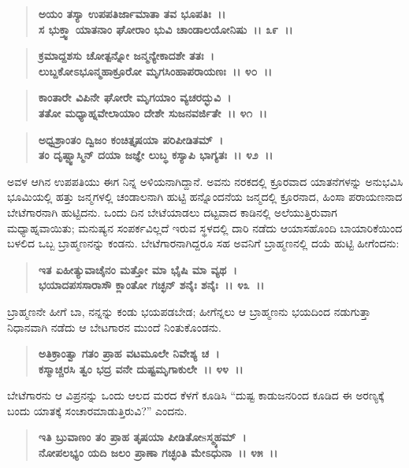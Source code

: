 \begin{verse}
\textbf{ಅಯಂ ತಸ್ಯಾ ಉಪಪತಿರ್ಜಾಮಾತಾ ತವ ಭೂಪತಿಃ~।।}\\\textbf{ಸ ಭುಕ್ತ್ವಾ ಯಾತನಾಂ ಘೋರಾಂ ಭುವಿ ಚಾಂಡಾಲಯೋನಿಷು~।। ೩೯~।।}
\end{verse}

\begin{verse}
\textbf{ಕ್ರಮಾದ್ದಶಸು ಚೋತ್ಪನ್ನೋ ಜನ್ಮನ್ಯೇಕಾದಶೇ ತತಃ~।}\\\textbf{ಲುಬ್ದಕೋಽಭೂನ್ಮಹಾಕ್ರೂರೋ ಮೃಗಸಿಂಹಾಪರಾಯಣಃ~।। ೪೦~।। }
\end{verse}

\begin{verse}
\textbf{ಕಾಂತಾರೇ ವಿಪಿನೇ ಘೋರೇ ಮೃಗಯಾಂ ವ್ಯಚರದ್ಭುವಿ~।}\\\textbf{ತತೋ ಮಧ್ಯಾಹ್ನವೇಲಾಯಾಂ ದೇಶೇ ಸುಜನವರ್ಜಿತೇ~।। ೪೧~।। }
\end{verse}

\begin{verse}
\textbf{ಅಧ್ವಶ್ರಾಂತಂ ದ್ವಿಜಂ ಕಂಚಿತ್ತೃಷಯಾ ಪರಿಪೀಡಿತಮ್~।}\\\textbf{ತಂ ದೃಷ್ಟ್ವಾಸ್ಮಿನ್ ದಯಾ ಜಜ್ಞೇ ಲುಬ್ಧ ಕಸ್ಯಾಪಿ ಭಾಗ್ಯತಃ~।। ೪೨~।।}
\end{verse}

ಅವಳ ಆಗಿನ ಉಪಪತಿಯು ಈಗ ನಿನ್ನ ಅಳಿಯನಾಗಿದ್ದಾನೆ. ಅವನು ನರಕದಲ್ಲಿ ಕ್ರೂರವಾದ ಯಾತನೆಗಳನ್ನು ಅನುಭವಿಸಿ ಭೂಮಿಯಲ್ಲಿ ಹತ್ತು ಜನ್ಮಗಳಲ್ಲಿ ಚಂಡಾಲನಾಗಿ ಹುಟ್ಟಿ ಹನ್ನೊಂದನೆಯ ಜನ್ಮದಲ್ಲಿ ಕ್ರೂರನಾದ, ಹಿಂಸಾ ಪರಾಯಣನಾದ ಬೇಟೆಗಾರನಾಗಿ ಹುಟ್ಟಿದನು. ಒಂದು ದಿನ ಬೇಟೆಯಾಡಲು ದಟ್ಟವಾದ ಕಾಡಿನಲ್ಲಿ ಅಲೆಯುತ್ತಿರುವಾಗ ಮಧ್ಯಾಹ್ನವಾಯಿತು; ಮನುಷ್ಯನ ಸಂಪರ್ಕವಿಲ್ಲದೆ ಇರುವ ಸ್ಥಳದಲ್ಲಿ ದಾರಿ ನಡೆದು ಆಯಾಸಹೊಂದಿ ಬಾಯಾರಿಕೆಯಿಂದ ಬಳಲಿದ ಒಬ್ಬ ಬ್ರಾಹ್ಮಣನನ್ನು ಕಂಡನು. ಬೇಟೆಗಾರನಾಗಿದ್ದರೂ ಸಹ ಅವನಿಗೆ ಬ್ರಾಹ್ಮಣನಲ್ಲಿ ದಯೆ ಹುಟ್ಟಿ ಹೀಗೆಂದನು:

\begin{verse}
\textbf{ಇತ ಏಹೀತ್ಯುವಾಚೈನಂ ಮತ್ತೋ ಮಾ ಭೈಷಿ ಮಾ ವ್ಯಥ~।}\\\textbf{ಭಯಾದಪಸಸಾರಾಸೌ ಕ್ಲಾಂತೋ ಗಚ್ಛನ್ ಶನೈಃ ಶನೈಃ~।। ೪೩~।। }
\end{verse}

ಬ್ರಾಹ್ಮಣನೇ ಹೀಗೆ ಬಾ, ನನ್ನನ್ನು ಕಂಡು ಭಯಪಡಬೇಡ; ಹೀಗೆನ್ನಲು ಆ ಬ್ರಾಹ್ಮಣನು ಭಯದಿಂದ ನಡುಗುತ್ತಾ ನಿಧಾನವಾಗಿ ನಡೆದು ಆ ಬೇಟಗಾರನ ಮುಂದೆ ನಿಂತುಕೊಂಡನು.

\begin{verse}
\textbf{ಅತಿಕ್ರಾಂತ್ವಾ ಗತಂ ಪ್ರಾಹ ವಟಮೂಲೇ ನಿವೇಶ್ಯ ಚ~।}\\\textbf{ಕಸ್ಮಾಚ್ಚರಸಿ ತ್ವಂ ಭದ್ರ ವನೇ ದುಷ್ಟಮೃಗಾಕುಲೇ~।। ೪೪~।। }
\end{verse}

ಬೇಟೆಗಾರನು ಆ ವಿಪ್ರನನ್ನು ಒಂದು ಆಲದ ಮರದ ಕೆಳಗೆ ಕೂಡಿಸಿ “ದುಷ್ಟ ಕಾಡುಜನರಿಂದ ಕೂಡಿದ ಈ ಅರಣ್ಯಕ್ಕೆ ಬಂದು ಯಾತಕ್ಕೆ ಸಂಚಾರಮಾಡುತ್ತಿರುವಿ?” ಎಂದನು.

\begin{verse}
\textbf{ಇತಿ ಬ್ರುವಾಣಂ ತಂ ಪ್ರಾಹ ತೃಷಯಾ ಪೀಡಿತೋsಸ್ಮ್ಯಹಮ್~।}\\\textbf{ನೋಪಲಭ್ಯಂ ಯದಿ ಜಲಂ ಪ್ರಾಣಾ ಗಚ್ಛಂತಿ ಮೇಽಧುನಾ~।। ೪೫~।। }
\end{verse}

